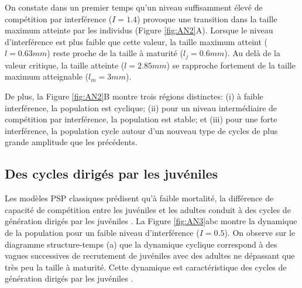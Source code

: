 On constate dans un premier temps qu'un niveau suffisamment élevé de compétition
par interférence ($I=1.4$) provoque une transition dans la taille maximum
atteinte par les individus (Figure \ref{fig:AN2}A). Lorsque le niveau
d'interférence est plus faible que cette valeur, la taille maximum atteint ($l=0.63mm$) reste proche de la taille à
maturité ($l_j=0.6mm$). Au delà de la valeur critique, la taille atteinte
($l=2.85mm$) se rapproche fortement de la taille maximum atteignable
($l_m=3mm$). 

De plus, la Figure \ref{fig:AN2}B montre trois régions distinctes: (i) à faible
interférence, la population est cyclique; (ii) pour un niveau intermédiaire de
compétition par interférence, la population est stable; et (iii) pour une forte
interférence, la population cycle autour d'un nouveau type de cycles de plus
grande amplitude que les précédents. 

\subsection{Des cycles dirigés par les juvéniles}

Les modèles PSP classiques prédisent qu'à faible mortalité, la différence de
capacité de compétition entre les juvéniles et les adultes conduit à des cycles
de génération dirigés par les juvéniles \autocites{de-roos1992a,de-roos1997a}.
La Figure \ref{fig:AN3}abc montre la dynamique de la population pour un faible
niveau d'interférence ($I=0.5$). On observe sur le diagramme structure-temps (a)
que la dynamique cyclique correspond à des vagues successives de recrutement de
juvéniles avec des adultes ne dépassant que très peu la taille à maturité. Cette
dynamique est caractéristique des cycles de génération dirigés par les juvéniles
\autocites{de-roos1992a,de-roos2003a}.

